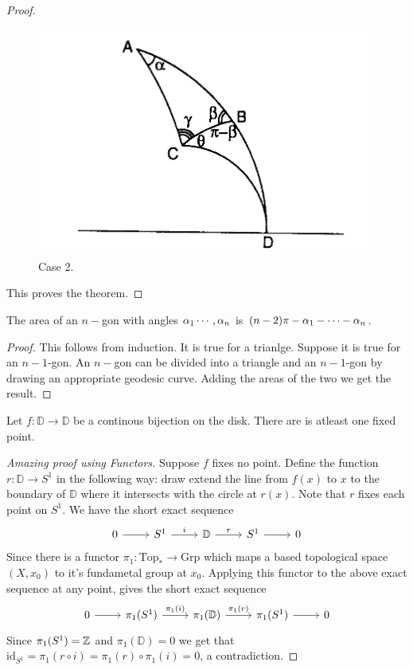 \begin{proof}
\begin{figure}[h]
  \centering
  \includegraphics[scale=0.5]{figures/gauss-bonnet-2.png}
  \caption{Case 2.}
\end{figure}
This proves the theorem.
\end{proof}
\begin{corollary}
  The area of an $n-$gon with angles $\alpha_1\cdots, \alpha_n$ is $(n-2)\pi - \alpha_1 - \cdots - \alpha_n$.
\end{corollary}
\begin{proof}
  This follows from induction. It is true for a trianlge. Suppose it is true for an $n-1$-gon. An $n-$gon can be divided into a triangle and an $n-1$-gon by drawing an appropriate geodesic curve. Adding the areas of the two we get the result.    
\end{proof}
\begin{theorem}
  Let $f: \mathbb{D} \to \mathbb{D}$ be a continous bijection on the disk. There are is atleast one fixed point.
\end{theorem}
\begin{proof}[Amazing proof using Functors]
  Suppose $f$ fixes no point. Define the function $r: \mathbb{D} \to S^1$ in the following way: draw extend the line from $f(x)$ to $x$ to the boundary of $ \mathbb{D}$ where it intersects with the circle at $r(x)$. Note that $r$ fixes each point on $S^1$. We have the short exact sequence
  \[
    \begin{tikzcd}
      0 \arrow[r] & S^1 \arrow[r, "i"]  & \mathbb{D} \arrow[r, "r"]  & S^1 \arrow[r] & 0
    \end{tikzcd}
  \]
  Since there is a functor $ \pi_1: \text{Top}_* \to \text{Grp}$ which maps a based topological space $(X,x_0)$ to it's fundametal group at $x_0$. Applying this functor to the above exact sequence at any point, gives the short exact sequence
  \[
    \begin{tikzcd}
      0 \arrow[r] & \pi_1(S^1) \arrow[r, "\pi_1(i)"]  & \pi_1(\mathbb{D}) \arrow[r, "\pi_1(r)"]  & \pi_1(S^1) \arrow[r] & 0
    \end{tikzcd}
  \]
  Since $\pi_1(S^1) = \mathbb{Z}$ and $\pi_1( \mathbb{D}) = 0$ we get that $\text{id}_{S^1} = \pi_1(r\circ i) = \pi_1(r)\circ\pi_1(i) = 0$, a contradiction. 
\end{proof}
